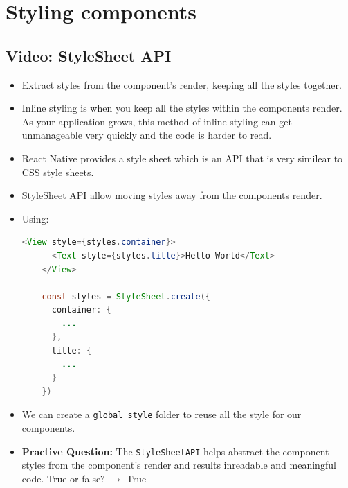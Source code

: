 \chapter{Styling components}

\section{Video: StyleSheet API}
\begin{itemize}
  \item Extract styles from the component's render, keeping all the styles together.
  \item Inline styling is when you keep all the styles within the components render. As your application grows, this method of inline styling can get unmanageable very quickly and the code is harder to read. 
  \item React Native provides a style sheet which is an API that is very similear to CSS style sheets.
  \item StyleSheet API allow moving styles away from the components render.
  \item Using:
  \begin{lstlisting}[language=Java, numbers=none]
    <View style={styles.container}>
      <Text style={styles.title}>Hello World</Text>
    </View>

    const styles = StyleSheet.create({
      container: {
        ...
      },
      title: {
        ...
      }
    })
  \end{lstlisting}
  \item We can create a \texttt{global style} folder to reuse all the style for our components.
  \item \textbf{Practive Question:} The \texttt{StyleSheetAPI} helps abstract the component styles from the component's render and results inreadable and meaningful code.  True or false?
    $\rightarrow$ True
\end{itemize}

